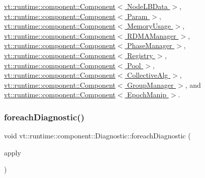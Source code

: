 \hyperlink{structvt_1_1runtime_1_1component_1_1_component_adaf8bd995d4c91702e2ff7806ad9e695}{vt\+::runtime\+::component\+::\+Component$<$ Node\+L\+B\+Data $>$}, \hyperlink{structvt_1_1runtime_1_1component_1_1_component_adaf8bd995d4c91702e2ff7806ad9e695}{vt\+::runtime\+::component\+::\+Component$<$ Param $>$}, \hyperlink{structvt_1_1runtime_1_1component_1_1_component_adaf8bd995d4c91702e2ff7806ad9e695}{vt\+::runtime\+::component\+::\+Component$<$ Memory\+Usage $>$}, \hyperlink{structvt_1_1runtime_1_1component_1_1_component_adaf8bd995d4c91702e2ff7806ad9e695}{vt\+::runtime\+::component\+::\+Component$<$ R\+D\+M\+A\+Manager $>$}, \hyperlink{structvt_1_1runtime_1_1component_1_1_component_adaf8bd995d4c91702e2ff7806ad9e695}{vt\+::runtime\+::component\+::\+Component$<$ Phase\+Manager $>$}, \hyperlink{structvt_1_1runtime_1_1component_1_1_component_adaf8bd995d4c91702e2ff7806ad9e695}{vt\+::runtime\+::component\+::\+Component$<$ Registry $>$}, \hyperlink{structvt_1_1runtime_1_1component_1_1_component_adaf8bd995d4c91702e2ff7806ad9e695}{vt\+::runtime\+::component\+::\+Component$<$ Pool $>$}, \hyperlink{structvt_1_1runtime_1_1component_1_1_component_adaf8bd995d4c91702e2ff7806ad9e695}{vt\+::runtime\+::component\+::\+Component$<$ Collective\+Alg $>$}, \hyperlink{structvt_1_1runtime_1_1component_1_1_component_adaf8bd995d4c91702e2ff7806ad9e695}{vt\+::runtime\+::component\+::\+Component$<$ Group\+Manager $>$}, and \hyperlink{structvt_1_1runtime_1_1component_1_1_component_adaf8bd995d4c91702e2ff7806ad9e695}{vt\+::runtime\+::component\+::\+Component$<$ Epoch\+Manip $>$}.

\mbox{\label{structvt_1_1runtime_1_1component_1_1_diagnostic_a1d6951af40ad0b4020860c0b21b1a85c}} 
\subsubsection{\texorpdfstring{foreach\+Diagnostic()}{foreachDiagnostic()}}
{\footnotesize\ttfamily void vt\+::runtime\+::component\+::\+Diagnostic\+::foreach\+Diagnostic (\begin{DoxyParamCaption}\item[{std\+::function$<$ void(\hyperlink{structvt_1_1runtime_1_1component_1_1detail_1_1_diagnostic_base}{detail\+::\+Diagnostic\+Base} $\ast$)$>$}]{apply }\end{DoxyParamCaption})}



